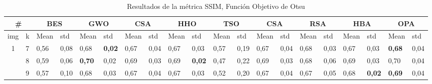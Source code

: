 \documentclass[conference]{IEEEtran}
\begin{document}
\begin{table}[]
	\caption{Resultados de la métrica SSIM, Función Objetivo de Otsu}
	\begin{tabular}{|cl|ll|ll|ll|ll|ll|ll|ll|ll|ll|}
		\hline
		\multicolumn{2}{|c|}{\#} & \multicolumn{2}{c|}{BES} & \multicolumn{2}{c|}{GWO} & \multicolumn{2}{c|}{CSA} & \multicolumn{2}{c|}{HHO} & \multicolumn{2}{c|}{TSO} & \multicolumn{2}{c|}{CSA} & \multicolumn{2}{c|}{RSA} & \multicolumn{2}{c|}{HBA} & \multicolumn{2}{c|}{OPA} \\ \hline
		\multicolumn{1}{|l|}{img}                 & k & \multicolumn{1}{l|}{Mean}          & std           & \multicolumn{1}{l|}{Mean}          & std           & \multicolumn{1}{l|}{Mean}          & std           & \multicolumn{1}{l|}{Mean} & std           & \multicolumn{1}{l|}{Mean}                 & std           & \multicolumn{1}{l|}{Mean}          & std           & \multicolumn{1}{l|}{Mean}          & std           & \multicolumn{1}{l|}{Mean}          & std           & \multicolumn{1}{l|}{Mean}          & std           \\ \hline
		\multicolumn{1}{|c|}{\multirow{3}{*}{1}}  & 7 & \multicolumn{1}{l|}{0,56}          & 0,08          & \multicolumn{1}{l|}{0,68}          & \textbf{0,02} & \multicolumn{1}{l|}{0,67}          & 0,04          & \multicolumn{1}{l|}{0,67} & 0,03          & \multicolumn{1}{l|}{0,57}                 & 0,19          & \multicolumn{1}{l|}{0,67}          & 0,04          & \multicolumn{1}{l|}{0,68}          & 0,03          & \multicolumn{1}{l|}{0,67}          & 0,03          & \multicolumn{1}{l|}{\textbf{0,68}} & 0,04          \\ \cline{2-20} 
		\multicolumn{1}{|c|}{}                    & 8 & \multicolumn{1}{l|}{0,59}          & 0,06          & \multicolumn{1}{l|}{\textbf{0,70}} & 0,02          & \multicolumn{1}{l|}{0,69}          & 0,03          & \multicolumn{1}{l|}{0,69} & \textbf{0,02} & \multicolumn{1}{l|}{0,47}                 & 0,22          & \multicolumn{1}{l|}{0,69}          & 0,03          & \multicolumn{1}{l|}{0,68}          & 0,06          & \multicolumn{1}{l|}{0,69}          & 0,03          & \multicolumn{1}{l|}{0,70}          & 0,04          \\ \cline{2-20} 
		\multicolumn{1}{|c|}{}                    & 9 & \multicolumn{1}{l|}{0,57}          & 0,10          & \multicolumn{1}{l|}{0,68}          & 0,03          & \multicolumn{1}{l|}{0,67}          & 0,04          & \multicolumn{1}{l|}{0,67} & 0,03          & \multicolumn{1}{l|}{0,52}                 & 0,20          & \multicolumn{1}{l|}{0,67}          & 0,04          & \multicolumn{1}{l|}{0,67}          & 0,05          & \multicolumn{1}{l|}{0,68}          & \textbf{0,02} & \multicolumn{1}{l|}{\textbf{0,69}} & 0,04          \\ \hline

\end{tabular}
\end{table}
\end{document}
